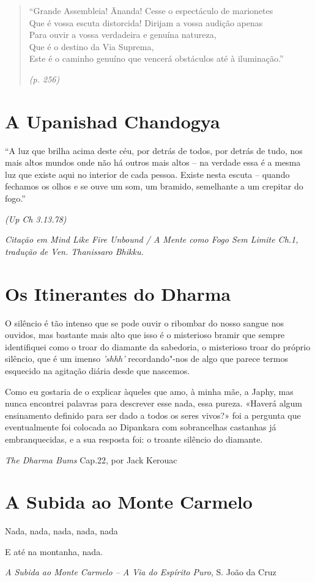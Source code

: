 \begin{quotation}
``Grande Assembleia! Ānanda! Cesse o espectáculo de marionetes\\
Que é vossa escuta distorcida! Dirijam a vossa audição apenas\\
Para ouvir a vossa verdadeira e genuína natureza,\\
Que é o destino da Via Suprema,\\
Este é o caminho genuíno que vencerá obstáculos até à iluminação.''

\emph{(p. 256)}
\end{quotation}

\clearpage

\section*{A Upanishad Chandogya}

``A luz que brilha acima deste céu, por detrás de todos, por detrás de
tudo, nos mais altos mundos onde não há outros mais altos -- na verdade
essa é a mesma luz que existe aqui no interior de cada pessoa. Existe
nesta escuta -- quando fechamos os olhos e se ouve um som, um bramido,
semelhante a um crepitar do fogo.''

\emph{(Up Ch 3.13.78)}

{\small\itshape
  Citação em \emph{Mind Like Fire Unbound} / \emph{A Mente como Fogo Sem Limite}
  Ch.1, tradução de Ven. Thanissaro Bhikku.
}

\section*{Os Itinerantes do Dharma}

O silêncio é tão intenso que se pode ouvir o ribombar do nosso sangue
nos ouvidos, mas bastante mais alto que isso é o misterioso bramir que
sempre identifiquei como o troar do diamante da sabedoria, o misterioso
troar do próprio silêncio, que é um imenso \emph{'shhh'} recordando"-nos
de algo que parece termos esquecido na agitação diária desde que
nascemos.

Como eu gostaria de o explicar àqueles que amo, à minha mãe, a Japhy,
mas nunca encontrei palavras para descrever esse nada, essa pureza.
«Haverá algum ensinamento definido para ser dado a todos os seres
vivos?» foi a pergunta que eventualmente foi colocada ao Dipankara com
sobrancelhas castanhas já embranquecidas, e a sua resposta foi: o
troante silêncio do diamante.

\emph{The Dharma Bums} Cap.22, por Jack Kerouac

\clearpage

\section*{A Subida ao Monte Carmelo}

Nada, nada, nada, nada, nada

E até na montanha, nada.

\emph{A Subida ao Monte Carmelo -- A Via do Espírito Puro}, S. João da
Cruz

\setlength{\parskip}{0pt}
\setlength{\parindent}{17pt}
